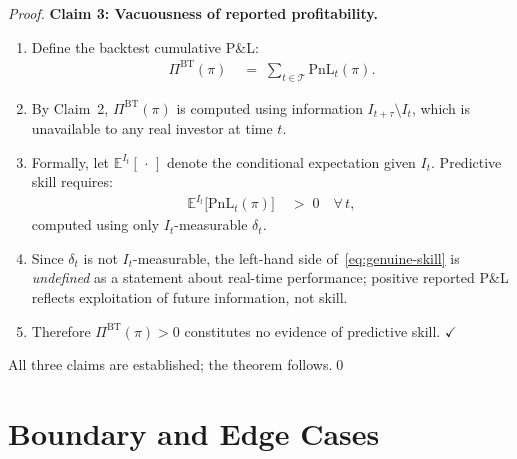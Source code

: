 \documentclass[12pt,openany]{book}
\newcommand{\calI}{\mathcal{I}}
\numberwithin{equation}{chapter}
\theoremstyle{plain}
\theoremstyle{definition}
\theoremstyle{remark}
\numberwithin{equation}{chapter}
\theoremstyle{plain}
\def\calI{I}%
\begin{document}
\begin{proof}
\medskip
\noindent\textbf{Claim 3: Vacuousness of reported profitability.}
\begin{enumerate}
  \item Define the backtest cumulative P\&L:
        \begin{align}
          \Pi^{\mathrm{BT}}(\pi)
          &\;=\; \sum_{t \in \mathcal{T}} \mathrm{PnL}_t(\pi).
          \label{eq:bt-pnl}
        \end{align}
  \item By Claim~2, $\Pi^{\mathrm{BT}}(\pi)$ is computed using
        information $\calI_{t+\tau} \setminus \calI_t$, which is
        unavailable to any real investor at time $t$.
  \item Formally, let $\mathbb{E}^{\calI_t}[\,\cdot\,]$ denote the
        conditional expectation given $\calI_t$.  Predictive skill
        requires:
        \begin{align}
          \mathbb{E}^{\calI_t}\!\bigl[\mathrm{PnL}_t(\pi)\bigr]
          &\;>\; 0
          \quad \forall\, t,
          \label{eq:genuine-skill}
        \end{align}
        computed using only $\calI_t$-measurable $\delta_t$.
  \item Since $\delta_t$ is not $\calI_t$-measurable, the left-hand
        side of~\eqref{eq:genuine-skill} is \emph{undefined} as a
        statement about real-time performance; positive reported
        P\&L reflects exploitation of future information, not skill.
  \item Therefore $\Pi^{\mathrm{BT}}(\pi) > 0$ constitutes no
        evidence of predictive skill. $\checkmark$
\end{enumerate}
All three claims are established; the theorem follows.\qed
\end{proof}

\section{Boundary and Edge Cases}
\end{document}
